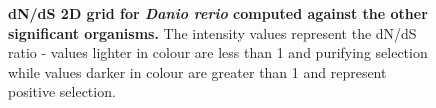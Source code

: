 \documentclass{article}
\begin{document}
\begin{figure}[H]
\centering
{}
\caption{\textbf{dN/dS 2D grid for \textit{Danio rerio} computed against the other significant organisms.} The intensity values represent the dN/dS ratio - values lighter in colour are less than 1 and purifying selection while values darker in colour are greater than 1 and represent positive selection.}
\label{sup_fig_23}
\end{figure}
\end{document}

